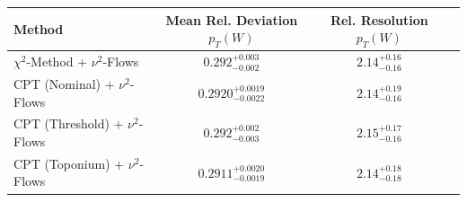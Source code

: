     \begin{tabular}{lccc}
        \toprule
        Method & Mean Rel. Deviation $p_{T}(W)$ & Rel. Resolution $p_{T}(W)$ \\
        \midrule
        $\chi^2$-Method + $\nu^2$-Flows & $0.292^{+0.003}_{-0.002}$ & $2.14^{+0.16}_{-0.16}$ \\
        CPT (Nominal) + $\nu^2$-Flows & $0.2920^{+0.0019}_{-0.0022}$ & $2.14^{+0.19}_{-0.16}$ \\
        CPT (Threshold) + $\nu^2$-Flows & $0.292^{+0.002}_{-0.003}$ & $2.15^{+0.17}_{-0.16}$ \\
        CPT (Toponium) + $\nu^2$-Flows & $0.2911^{+0.0020}_{-0.0019}$ & $2.14^{+0.18}_{-0.18}$ \\
        \bottomrule
    \end{tabular}